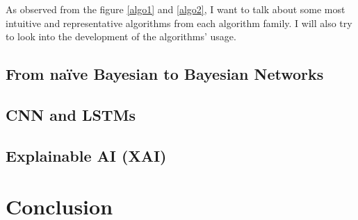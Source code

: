 \documentclass[runningheads]{llncs}
\begin{document}
		As observed from the figure \ref{algo1} and \ref{algo2}, I want to talk about some most intuitive and representative algorithms from each algorithm family. I will also try to look into the development of the algorithms' usage.
		
		
		
		
		\subsection{From naïve Bayesian to Bayesian Networks}
		
		\subsection{CNN and LSTMs}
		
		\subsection{Explainable AI (XAI)}
		
		
		\section{Conclusion}
\end{document}
